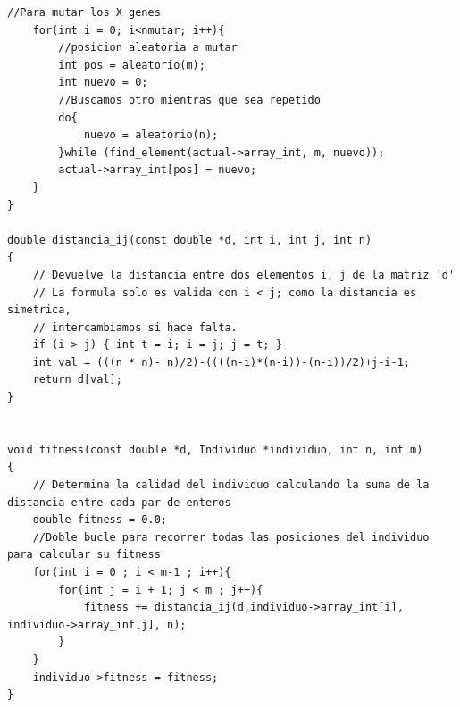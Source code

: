 \documentclass[12pt]{article}
\begin{document}
\begin{lstlisting}[style=EstiloC]
    //Para mutar los X genes
    for(int i = 0; i<nmutar; i++){
        //posicion aleatoria a mutar
        int pos = aleatorio(m);
        int nuevo = 0;
        //Buscamos otro mientras que sea repetido
        do{
            nuevo = aleatorio(n);
        }while (find_element(actual->array_int, m, nuevo));
        actual->array_int[pos] = nuevo;
    }
}

double distancia_ij(const double *d, int i, int j, int n)
{
    // Devuelve la distancia entre dos elementos i, j de la matriz 'd'
    // La formula solo es valida con i < j; como la distancia es simetrica,
    // intercambiamos si hace falta.
    if (i > j) { int t = i; i = j; j = t; }
    int val = (((n * n)- n)/2)-((((n-i)*(n-i))-(n-i))/2)+j-i-1;
    return d[val];
}


void fitness(const double *d, Individuo *individuo, int n, int m)
{
    // Determina la calidad del individuo calculando la suma de la distancia entre cada par de enteros
    double fitness = 0.0;
    //Doble bucle para recorrer todas las posiciones del individuo para calcular su fitness
    for(int i = 0 ; i < m-1 ; i++){
        for(int j = i + 1; j < m ; j++){
            fitness += distancia_ij(d,individuo->array_int[i], individuo->array_int[j], n);
        }
    }
    individuo->fitness = fitness;
}


    
\end{lstlisting}
\end{document}

